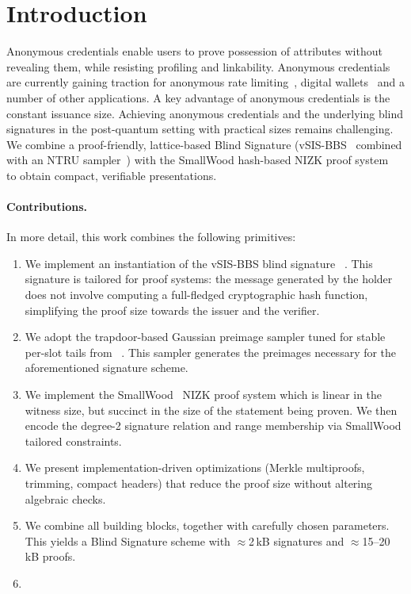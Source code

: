 \section{Introduction}
Anonymous credentials enable users to prove possession of attributes without revealing them, while resisting profiling and linkability. Anonymous credentials are currently gaining traction for anonymous rate limiting~\cite{yun-privacypass-crypto-arc-00,schlesinger-cfrg-act-00}, digital wallets~\cite{TODO} and a number of other applications. A key advantage of anonymous credentials is the constant issuance size. 
Achieving anonymous credentials and the underlying blind signatures in the post-quantum setting with practical sizes remains challenging. We combine a proof-friendly, lattice-based Blind Signature (vSIS-BBS~\cite{PKC:DKLW25} combined with an NTRU sampler~\cite{AC:ENSTW23}) with the SmallWood hash-based NIZK proof system~\cite{EPRINT:FenRiv25} to obtain compact, verifiable presentations. 

\paragraph{Contributions.}
In more detail, this work combines the following primitives:
\begin{enumerate}
    \item We implement an instantiation of the vSIS-BBS blind signature ~\cite{PKC:DKLW25}. This signature is tailored for proof systems: the message generated by the holder does not involve computing a full-fledged cryptographic hash function, simplifying the proof size towards the issuer and the verifier.
\item We adopt the trapdoor-based Gaussian preimage sampler tuned for stable per-slot tails from ~\cite{AC:ENSTW23}. This sampler generates the preimages necessary for the aforementioned signature scheme.
\item We implement the SmallWood~\cite{EPRINT:FenRiv25} NIZK proof system which is linear in the witness size, but succinct in the size of the statement being proven. We then encode the degree-2 signature relation and range membership via SmallWood tailored constraints.
\item We present implementation-driven optimizations (Merkle multiproofs, trimming, compact headers) that reduce the proof size without altering algebraic checks.
\item We combine all building blocks, together with carefully chosen parameters. This yields a Blind Signature scheme with $\approx$2\,kB signatures and $\approx$15--20\,kB proofs.
\item {}
\end{enumerate}

